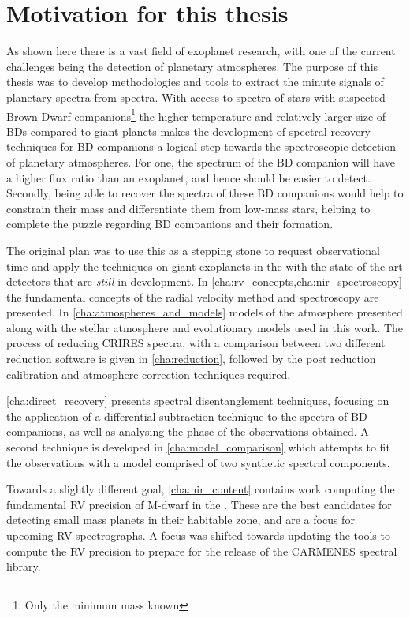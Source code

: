 \section{Motivation for this thesis}
\label{sec:thesis_motivation}

As shown here there is a vast field of exoplanet research, with one of the current challenges being the detection of planetary atmospheres.
The purpose of this thesis was to develop methodologies and tools to extract the minute signals of planetary spectra from \nir{} spectra.
With access to \nir{} spectra of stars with suspected Brown Dwarf companions\footnote{Only the minimum mass \Mtwosini known} the higher temperature and relatively larger size of BDs compared to giant-planets makes the development of spectral recovery techniques for BD companions a logical step towards the spectroscopic detection of planetary atmospheres.
For one, the spectrum of the BD companion will have a higher flux ratio than an exoplanet, and hence should be easier to detect.
Secondly, being able to recover the spectra of these BD companions would help to constrain their mass and differentiate them from low-mass stars, helping to complete the puzzle regarding BD companions and their formation.

The original plan was to use this as a stepping stone to request observational time and apply the techniques on giant exoplanets in the \nir{} with the state-of-the-art detectors that are \emph{still} in development.
In \cref{cha:rv_concepts,cha:nir_spectroscopy} the fundamental concepts of the radial velocity method and \nir{} spectroscopy are presented. In \cref{cha:atmospheres_and_models} models of the atmosphere presented along with the stellar atmosphere and evolutionary models used in this work.
The process of reducing \nir{} CRIRES spectra, with a comparison between two different reduction software is given in \cref{cha:reduction}, followed by the post reduction calibration and atmosphere correction techniques required.

\cref{cha:direct_recovery} presents spectral disentanglement techniques, focusing on the application of a differential subtraction technique to the \nir{} spectra of BD companions, as well as analysing the phase of the observations obtained.
A second technique is developed in \cref{cha:model_comparison} which attempts to fit the observations with a model comprised of two synthetic spectral components.

Towards a slightly different goal, \cref{cha:nir_content} contains work computing the fundamental RV precision of {M-dwarf} in the \nir{}.
These are the best candidates for detecting small mass planets in their habitable zone, and are a focus for upcoming \nir{} RV spectrographs.
A focus was shifted towards updating the tools to compute the RV precision to prepare for the release of the CARMENES \nir{} spectral library.
